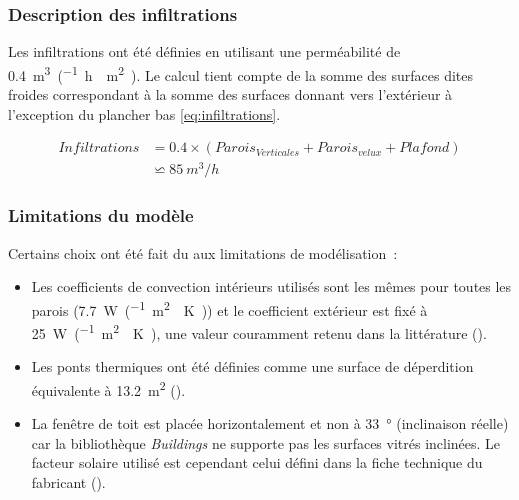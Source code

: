 \subsubsection{Description des infiltrations} %
\label{ssub:description_des_infiltrations}
Les infiltrations ont été définies en utilisant une perméabilité de
\SI{0.4}{m^{3}\per(\hour\period\meter\squared)}. Le calcul tient compte de la
somme des surfaces dites froides correspondant à la somme des surfaces donnant
vers l’extérieur à l’exception du plancher bas \eqref{eq:infiltrations}.

\begin{align}
    Infiltrations &= 0.4 \times (Parois_{Verticales} + Parois_{velux} + Plafond)\\
    &              \backsimeq \SI{85}{m^{3}/h}
    \label{eq:infiltrations}
\end{align}


\subsubsection{Limitations du modèle} %
\label{ssub:limitations_du_modele}
Certains choix ont été fait du aux limitations de modélisation~:
\begin{itemize}
    \item Les coefficients de convection intérieurs utilisés sont les mêmes pour toutes
          les parois (\SI{7.7}{\watt\per(\meter\squared\period\kelvin)}) et le coefficient extérieur
          est fixé à \SI{25}{\watt\per(\meter\squared\period\kelvin)}, une valeur couramment retenu
          dans la littérature ().
    \item Les ponts thermiques ont été définies comme une surface de déperdition
          équivalente à \SI{13.2}{\meter\squared} ().
    \item La fenêtre de toit est placée horizontalement et non à \SI{33}{\degree}
          (inclinaison réelle) car la bibliothèque \textit{Buildings} ne supporte pas les
          surfaces vitrés inclinées. Le facteur solaire utilisé est cependant celui défini
          dans la fiche technique du fabricant ().
\end{itemize}


